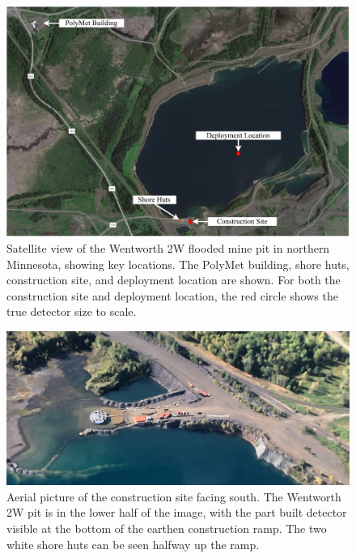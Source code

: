 \begin{figure} %
    \includegraphics[width=\textwidth]{diagrams/4-chips/pit.pdf}
    \caption[Satellite view of the Wentworth 2W mine pit in northern Minnesota]
    {Satellite view of the Wentworth 2W flooded mine pit in northern Minnesota, showing key
        \chipsfive locations. The PolyMet building, shore huts, construction site, and deployment
        location are shown. For both the construction site and deployment location, the red circle
        shows the true \chipsfive detector size to scale.}
    \label{fig:pit}
\end{figure}

\begin{figure} %
    \includegraphics[width=\textwidth]{diagrams/4-chips/from_the_air.pdf}
    \caption[Aerial picture of the \chipsfive construction site]
    {Aerial picture of the \chipsfive construction site facing south. The Wentworth 2W pit is in
        the lower half of the image, with the part built \chipsfive detector visible at the bottom
        of the earthen construction ramp. The two white shore huts can be seen halfway up the
        ramp.}
    \label{fig:from_the_sky}
\end{figure}

